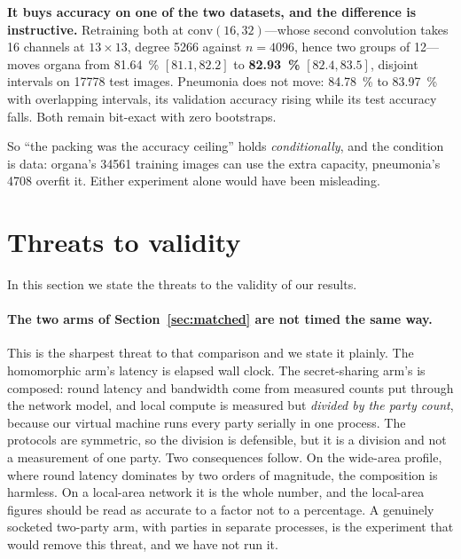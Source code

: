 \documentclass[11pt]{article}
\begin{document}
\textbf{It buys accuracy on one of the two datasets, and the difference is
instructive.} Retraining both at $\mathrm{conv}(16,32)$---whose second convolution
takes 16 channels at $13\times13$, degree \num{5266} against $n=4096$, hence two
groups of 12---moves organa from \SI{81.64}{\percent} $[81.1, 82.2]$ to
\textbf{\SI{82.93}{\percent}} $[82.4, 83.5]$, disjoint intervals on \num{17778} test
images. Pneumonia does not move: \SI{84.78}{\percent} to \SI{83.97}{\percent} with
overlapping intervals, its validation accuracy rising while its test accuracy falls.
Both remain bit-exact with zero bootstraps.

So ``the packing was the accuracy ceiling'' holds \emph{conditionally}, and the
condition is data: organa's \num{34561} training images can use the extra capacity,
pneumonia's \num{4708} overfit it. Either experiment alone would have been misleading.
\section{Threats to validity}
\label{sec:threats}

In this section we state the threats to the validity of our results.

\paragraph{The two arms of Section~\ref{sec:matched} are not timed the same way.}
This is the sharpest threat to that comparison and we state it plainly. The
homomorphic arm's latency is elapsed wall clock. The secret-sharing arm's is
composed: round latency and bandwidth come from measured counts put through the
network model, and local compute is measured but \emph{divided by the party count},
because our virtual machine runs every party serially in one process. The
protocols are symmetric, so the division is defensible, but it is a division and
not a measurement of one party. Two consequences follow. On the wide-area profile,
where round latency dominates by two orders of magnitude, the composition is
harmless. On a local-area network it is the whole number, and the local-area
figures should be read as accurate to a factor not to a percentage. A
genuinely socketed two-party arm, with parties in separate processes, is the
experiment that would remove this threat, and we have not run it.
\end{document}

